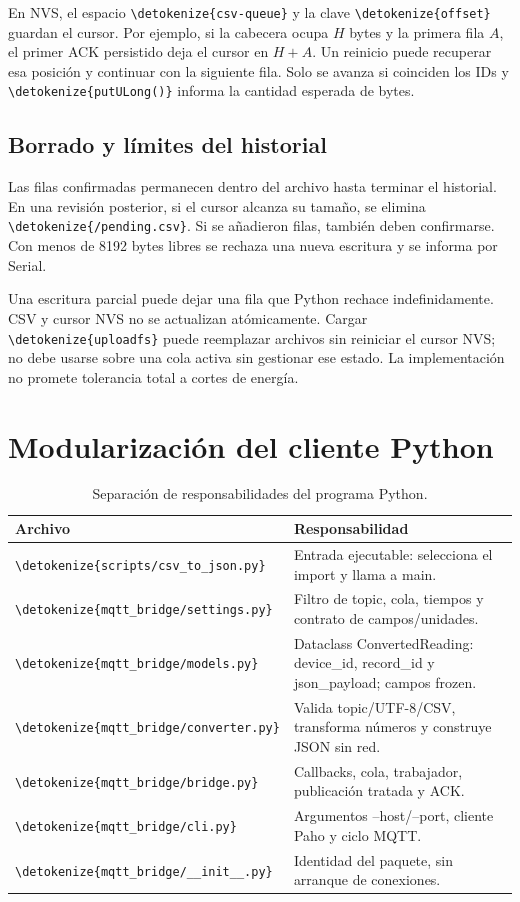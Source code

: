 \documentclass[11pt,a4paper]{article}
\newcommand{\code}[1]{\expandafter\nolinkurl\expandafter{\detokenize{#1}}}
\newcommand{\nextsection}[1]{\clearpage\section{#1}}
\begin{document}
En NVS, el espacio \code{csv-queue} y la clave \code{offset} guardan el cursor. Por ejemplo, si la cabecera ocupa $H$ bytes y la primera fila $A$, el primer ACK persistido deja el cursor en $H+A$. Un reinicio puede recuperar esa posición y continuar con la siguiente fila. Solo se avanza si coinciden los IDs y \code{putULong()} informa la cantidad esperada de bytes.

\subsection{Borrado y límites del historial}
Las filas confirmadas permanecen dentro del archivo hasta terminar el historial. En una revisión posterior, si el cursor alcanza su tamaño, se elimina \code{/pending.csv}. Si se añadieron filas, también deben confirmarse. Con menos de 8192 bytes libres se rechaza una nueva escritura y se informa por Serial.

Una escritura parcial puede dejar una fila que Python rechace indefinidamente. CSV y cursor NVS no se actualizan atómicamente. Cargar \code{uploadfs} puede reemplazar archivos sin reiniciar el cursor NVS; no debe usarse sobre una cola activa sin gestionar ese estado. La implementación no promete tolerancia total a cortes de energía.

\nextsection{Modularización del cliente Python}
\begin{table}[h!]
\small
\begin{tabularx}{\linewidth}{@{}P{41mm}Y@{}}
\toprule
\textbf{Archivo} & \textbf{Responsabilidad}\\\midrule
\code{scripts/csv_to_json.py} & Entrada ejecutable: selecciona el import y llama a main.\\
\code{mqtt_bridge/settings.py} & Filtro de topic, cola, tiempos y contrato de campos/unidades.\\
\code{mqtt_bridge/models.py} & Dataclass ConvertedReading: device\_id, record\_id y json\_payload; campos frozen.\\
\code{mqtt_bridge/converter.py} & Valida topic/UTF-8/CSV, transforma números y construye JSON sin red.\\
\code{mqtt_bridge/bridge.py} & Callbacks, cola, trabajador, publicación tratada y ACK.\\
\code{mqtt_bridge/cli.py} & Argumentos --host/--port, cliente Paho y ciclo MQTT.\\
\code{mqtt_bridge/__init__.py} & Identidad del paquete, sin arranque de conexiones.\\
\bottomrule
\end{tabularx}
\caption{Separación de responsabilidades del programa Python.}
\end{table}
\end{document}
